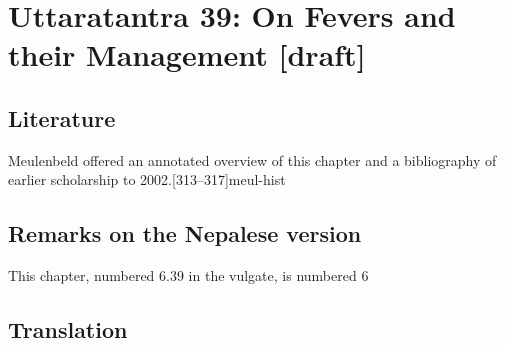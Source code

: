 
\chapter{Uttaratantra 39:  On Fevers and their Management [draft]}

\section{Literature} 

Meulenbeld offered an annotated overview of this chapter and a bibliography
of earlier scholarship to 2002.[313--317]{meul-hist} 

\section{Remarks on the Nepalese version}

This chapter, numbered 6.39 in the vulgate, is numbered 6


\newpage

\section{Translation}

